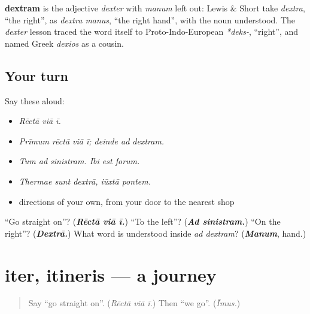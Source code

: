 \begin{cousinweb}
\textbf{dextram} is the adjective \emph{dexter} with \emph{manum} left out: Lewis \& Short take \emph{dextra}, \textquotedblleft{}the right\textquotedblright{}, as \emph{dextra manus}, \textquotedblleft{}the right hand\textquotedblright{}, with the noun understood. The \emph{dexter} lesson traced the word itself to Proto-Indo-European \emph{*deks-}, \textquotedblleft{}right\textquotedblright{}, and named Greek \emph{dexios} as a cousin.
\end{cousinweb}

\subsection*{Your turn}
Say these aloud:

\begin{itemize}
\raggedright
  \item \emph{Rēctā viā ī.}
  \item \emph{Prīmum rēctā viā ī; deinde ad dextram.}
  \item \emph{Tum ad sinistram. Ibi est forum.}
  \item \emph{Thermae sunt dextrā, iūxtā pontem.}
  \item directions of your own, from your door to the nearest shop
\end{itemize}

\begin{tcolorbox}[breakable,colback=teal!4,colframe=teal!35!black,title={Before you move on}]
\textquotedblleft{}Go straight on\textquotedblright{}? (\emph{\textbf{Rēctā viā ī.}}) \textquotedblleft{}To the left\textquotedblright{}? (\emph{\textbf{Ad sinistram.}}) \textquotedblleft{}On the right\textquotedblright{}? (\emph{\textbf{Dextrā.}}) What word is understood inside \emph{ad dextram}? (\emph{\textbf{Manum}}, hand.)
\end{tcolorbox}
\section[iter, itineris]{iter, itineris — a journey}

\label{lesson:LA-C285-iter}



\begin{quote}
Say \textquotedblleft{}go straight on\textquotedblright{}. (\emph{Rēctā viā ī.}) Then \textquotedblleft{}we go\textquotedblright{}. (\emph{Īmus.})
\end{quote}

